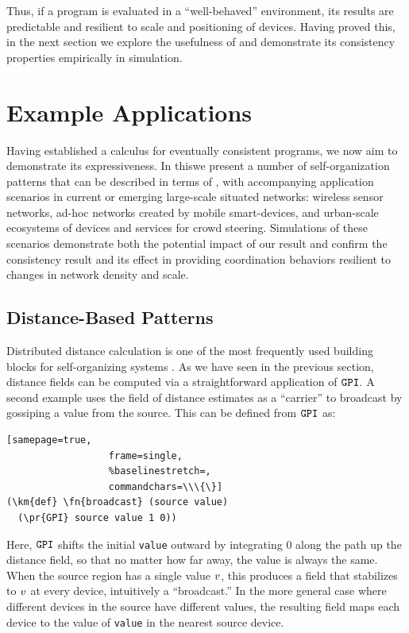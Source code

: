 \documentclass[12pt,a4paper,twoside,openright]{book}
\begin{document}
Thus, if a program is evaluated in a ``well-behaved'' environment, its results are predictable and resilient to scale and positioning of devices.
%
Having proved this, in the next section we explore the usefulness of \calculus{} and demonstrate its consistency properties empirically in simulation.

\section{Example Applications}

Having established a calculus for eventually consistent programs, we now aim to demonstrate its expressiveness.
%
In this\levelText{}we present a number of self-organization patterns that can be described in terms of \calculus{}, with accompanying application scenarios in current or emerging large-scale situated networks: wireless sensor networks, ad-hoc networks created by mobile smart-devices, and urban-scale ecosystems of devices and services for crowd steering.
%
Simulations of these scenarios demonstrate both the potential impact of our result and confirm the consistency result and its effect in providing coordination behaviors resilient to changes in network density and scale.

\subsection{Distance-Based Patterns}

Distributed distance calculation is one of the most frequently used building blocks for self-organizing systems \cite{FDMVA-NACO2012}.
%
As we have seen in the previous section, distance fields can be computed via a straightforward application of $\texttt{GPI}$.
%
A second example uses the field of distance estimates as a ``carrier'' to broadcast by gossiping a value from the source.  This can be defined from $\texttt{GPI}$ as:
\begin{Verbatim}[samepage=true,
                  frame=single,
                  %baselinestretch=,
                  commandchars=\\\{\}]
(\km{def} \fn{broadcast} (source value)
  (\pr{GPI} source value 1 0))
\end{Verbatim}
Here, $\texttt{GPI}$ shifts the initial {\tt value} outward by integrating $0$ along the path up the distance field, so that no matter how far away, the value is always the same.
%
When the source region has a single value $v$, this produces a field that stabilizes to $v$ at every device, intuitively a ``broadcast.''
%
In the more general case where different devices in the source have different values, the resulting field maps each device to the value of \texttt{value} in the nearest source device.
\end{document}
